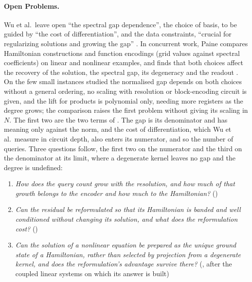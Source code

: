\paragraph{Open Problems.} Wu et al.\ leave open ``the spectral gap dependence'', the choice of basis, to be guided by ``the cost of differentiation'', and the data constraints, ``crucial for regularizing solutions and growing the gap'' \cite{wu2025pihm}. In concurrent work, Paine compares Hamiltonian constructions and function encodings (grid values against spectral coefficients) on linear and nonlinear examples, and finds that both choices affect the recovery of the solution, the spectral gap, its degeneracy and the readout \cite{paine2026concurrent}. On the few small instances studied the normalised gap depends on both choices without a general ordering, no scaling with resolution or block-encoding circuit is given, and the lift for products is polynomial only, needing more registers as the degree grows; the comparison raises the first problem without giving its scaling in $N$. The first two are the two terms of . The gap is its denominator and has meaning only against the norm, and the cost of differentiation, which Wu et al.\ measure in circuit depth, also enters its numerator, and so the number of queries. Three questions follow, the first two on the numerator and the third on the denominator at its limit, where a degenerate kernel leaves no gap and the degree is undefined:
\begin{enumerate}[label=(\roman*)]
    \item \emph{How does the query count grow with the resolution, and how much of that growth belongs to the encoder and how much to the Hamiltonian?} ()
    \item \emph{Can the residual be reformulated so that its Hamiltonian is banded and well conditioned without changing its solution, and what does the reformulation cost?} ()
    \item \emph{Can the solution of a nonlinear equation be prepared as the unique ground state of a Hamiltonian, rather than selected by projection from a degenerate kernel, and does the reformulation's advantage survive there?} (, after the coupled linear systems on which its answer is built)
\end{enumerate}
